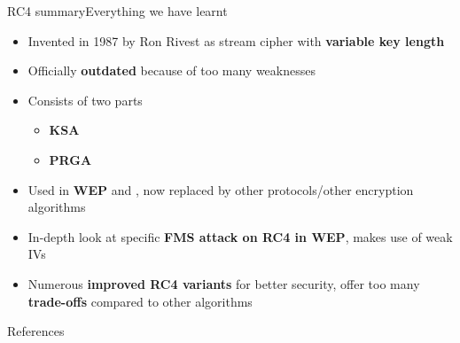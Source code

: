 \documentclass[
	aspectratio=169,	%
	onlytextwidth,		%
	t,					%
	]{beamer}
\begin{document}
\begin{frame}[fragile]{RC4 summary}{Everything we have learnt}
	\begin{itemize}
		\item Invented in 1987 by Ron Rivest as stream cipher with \textbf{variable key length}
		\item Officially \textbf{outdated} because of too many weaknesses
		\item Consists of two parts
		\begin{itemize}
			\item \textbf{KSA}
			\item \textbf{PRGA}
		\end{itemize}
		\item Used in \textbf{WEP} and , now replaced by other protocols/other encryption algorithms
		\item In-depth look at specific \textbf{FMS attack on RC4 in WEP}, makes use of weak IVs
		\item Numerous \textbf{improved RC4 variants} for better security, offer too many \textbf{trade-offs} compared to other algorithms
	\end{itemize}
\end{frame}

\makethankyou

\begin{frame}{References}

\end{frame}
\end{document}
